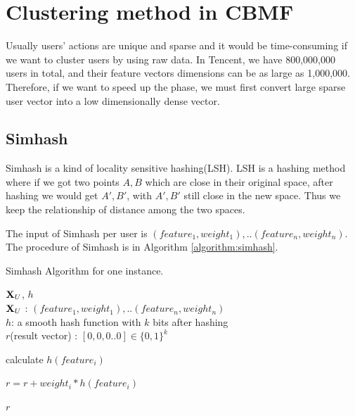 \section{Clustering method in CBMF}

Usually users’ actions are unique and sparse and it would be time-consuming if we want to cluster users by using raw data. In Tencent, we have 800,000,000 users in total, and their feature vectors dimensions can be as large as 1,000,000. Therefore, if we want to speed up the phase, we must first convert large sparse user vector into a low dimensionally dense vector.

\subsection{Simhash}

Simhash is a kind of locality sensitive hashing(LSH). LSH is a hashing method where if we got two points $A,B$ which are close in their original space, after hashing we would get $A',B'$, with $A',B'$ still close in the new space. Thus we keep the relationship of distance among the two spaces. 

The input of Simhash per user is $(feature_1, weight_1),..(feature_n,weight_n)$. The procedure of Simhash is in Algorithm \ref{algorithm:simhash}.

\begin{algorithm}[tb]
\caption{Simhash Algorithm for one instance.}
\begin{algorithmic}

 $\mathbf{X}_U$, $h$\\
$\mathbf{X}_{U}$ : $(feature_1, weight_1),..(feature_n,weight_n)$ \\
$h$: a smooth hash function with $k$ bits after hashing\\

 $r$(result vector) : $[0,0,0..0] \in \{0,1\}^k$


\STATE calculate $h(feature_i)$

\STATE $r = r + weight_i * h(feature_i)$

\ENDFOR

\ELSE 
{}
\ENDIF
\ENDFOR

 $r$

\end{algorithmic}
\label{algorithm:simhash}
\end{algorithm}


